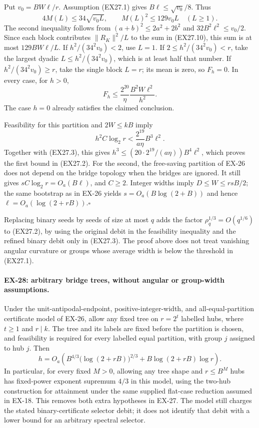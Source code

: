Put $v_0=BW\ell/r$. Assumption (EX27.1) gives
$B\ell\le\sqrt{v_0}/8$. Thus
\[
 4M(L)\le34\sqrt{v_0L},\qquad
 M(L)^2\le129v_0L\quad(L\ge1).
\]
The second inequality follows from
$(a+b)^2\le2a^2+2b^2$ and
$32B^2\ell^2\le v_0/2$.
Since each block contributes $\|R_K\|^2/L$ to the sum
in (EX27.10), this sum is at most $129BW\ell/L$.
If $h^2/(34^2v_0)<2$, use $L=1$.
If $2\le h^2/(34^2v_0)<r$, take the largest dyadic
$L\le h^2/(34^2v_0)$, which is at least half that number.
If $h^2/(34^2v_0)\ge r$, take the single block $L=r$;
its mean is zero, so $F_h=0$.
In every case, for $h>0$,
\[
 F_h\le\frac{2^{20}}{\eta}
             \frac{B^2W\ell^2}{h^2}.
 \tag{EX27.11}
\]
The case $h=0$ already satisfies the claimed conclusion.

Feasibility for this partition and $2W\le kB$ imply
\[
 h^2 C\log_2r
 <\frac{2^{19}}{a\eta}B^3\ell^2.
\]
Together with (EX27.3), this gives
$h^3\le(20\cdot2^{19}/(a\eta))B^4\ell^2$,
which proves the first bound in (EX27.2).
For the second, the free-saving partition of EX-26 does not
depend on the bridge topology when the bridges are ignored.
It still gives $sC\log_2r=O_a(B\ell)$, and $C\ge2$.
Integer widths imply $D\le W\le rsB/2$; the same bootstrap
as in EX-26 yields $s=O_a(B\log(2+B))$ and hence
$\ell=O_a(\log(2+rB))$.\hfill$\square$

Replacing binary seeds by seeds of size at most $q$ adds the
factor $\rho_q^{1/3}=O(q^{1/6})$ to (EX27.2), by using
the original debit in the feasibility inequality and the
refined binary debit only in (EX27.3). The proof above does
not treat vanishing angular curvature or groups whose
average width is below the threshold in (EX27.1).

\paragraph{EX-28: arbitrary bridge trees, without angular or group-width assumptions.}
Under the unit-antipodal-endpoint, positive-integer-width, and
all-equal-partition certificate model of EX-26, allow any fixed tree
on $r=2^t$ labelled hubs, where $t\ge1$ and $r\mid k$.
The tree and its labels are fixed before the partition is chosen,
and feasibility is required for every labelled equal partition,
with group $j$ assigned to hub $j$. Then
\[
 h=O_a\!\left(
 B^{4/3}\bigl(\log(2+rB)\bigr)^{2/3}
       +B\log(2+rB)\log r\right).
 \tag{EX28.1}
\]
In particular, for every fixed $M>0$, allowing any tree shape and
$r\le B^M$ hubs has fixed-power exponent supremum $4/3$ in this
model, using the two-hub construction for attainment under the
same supplied flat-case reduction assumed in EX-18. This removes
both extra hypotheses in EX-27. The model still charges the stated
binary-certificate selector debit; it does not identify that debit
with a lower bound for an arbitrary spectral selector.

